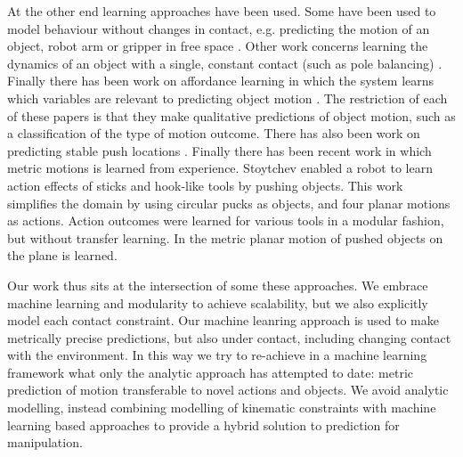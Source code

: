 At the other end learning approaches have been used. Some have been used to model behaviour without changes in contact, e.g. predicting the motion of an object, robot arm or gripper in free space \citep{Ting06,Boots14,dearden2005learning}. Other work concerns learning the dynamics of an object with a single, constant contact (such as pole balancing) \citep{Schaal97,SchaalAtkeson97}. Finally there has been work on affordance learning in which the system learns which variables are relevant to predicting object motion \citep{montesano08,moldovan12,hermans11,fitzpatrick_learning_2003,ridge2010self,kroemer2014}. The restriction of each of these papers is that they make qualitative predictions of object motion, such as a classification of the type of motion outcome. There has also been work on predicting stable push locations \citep{hermans13}. Finally there has been recent work in which metric motions is learned from experience. Stoytchev \citep{Stoytchev_affordances_2008} enabled a robot to learn action effects of sticks and hook-like tools by pushing objects. This work simplifies the domain by using circular pucks as objects, and four planar motions as actions. Action outcomes were learned for various tools in a modular fashion, but without transfer learning.  In \citep{mericli2014} the metric planar motion of pushed objects on the plane is learned. 

Our work thus sits at the intersection of some these approaches. We embrace machine learning and modularity to achieve scalability, but we also explicitly model each contact constraint. Our machine leanring approach is used to make metrically precise predictions, but also under contact, including changing contact with the environment. In this way we try to re-achieve in a machine learning framework what only the analytic approach has attempted to date: metric prediction of motion transferable to novel actions and objects. We avoid analytic modelling, instead combining modelling of kinematic constraints with machine learning based approaches to provide a hybrid solution to prediction for manipulation.